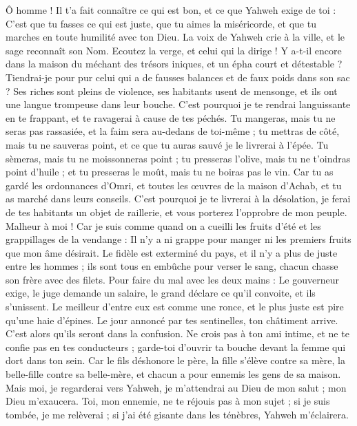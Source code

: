 \begin{multicols}{2}
Ô homme ! Il t'a fait connaître ce qui est bon, et ce que Yahweh exige de toi : C'est que tu fasses ce qui est juste, que tu aimes la miséricorde, et que tu marches en toute humilité avec ton Dieu.
La voix de Yahweh crie à la ville, et le sage reconnaît son Nom. Ecoutez la verge, et celui qui la dirige !
Y a-t-il encore dans la maison du méchant des trésors iniques, et un épha court et détestable ?
Tiendrai-je pour pur celui qui a de fausses balances et de faux poids dans son sac ?
Ses riches sont pleins de violence, ses habitants usent de mensonge, et ils ont une langue trompeuse dans leur bouche.
C'est pourquoi je te rendrai languissante en te frappant, et te ravagerai à cause de tes péchés.
Tu mangeras, mais tu ne seras pas rassasiée, et la faim sera au-dedans de toi-même ; tu mettras de côté, mais tu ne sauveras point, et ce que tu auras sauvé je le livrerai à l'épée.
Tu sèmeras, mais tu ne moissonneras point ; tu presseras l'olive, mais tu ne t'oindras point d'huile ; et tu presseras le moût, mais tu ne boiras pas le vin.
Car tu as gardé les ordonnances d'Omri, et toutes les œuvres de la maison d'Achab, et tu as marché dans leurs conseils. C'est pourquoi je te livrerai à la désolation, je ferai de tes habitants un objet de raillerie, et vous porterez l'opprobre de mon peuple.
\VerseOne{}Malheur à moi ! Car je suis comme quand on a cueilli les fruits d'été et les grappillages de la vendange : Il n'y a ni grappe pour manger ni les premiers fruits que mon âme désirait.
Le fidèle est exterminé du pays, et il n'y a plus de juste entre les hommes ; ils sont tous en embûche pour verser le sang, chacun chasse son frère avec des filets.
Pour faire du mal avec les deux mains : Le gouverneur exige, le juge demande un salaire, le grand déclare ce qu'il convoite, et ils s'unissent.
Le meilleur d'entre eux est comme une ronce, et le plus juste est pire qu'une haie d'épines. Le jour annoncé par tes sentinelles, ton châtiment arrive. C'est alors qu'ils seront dans la confusion.
Ne crois pas à ton ami intime, et ne te confie pas en tes conducteurs ; garde-toi d'ouvrir ta bouche devant la femme qui dort dans ton sein.
Car le fils déshonore le père, la fille s'élève contre sa mère, la belle-fille contre sa belle-mère, et chacun a pour ennemis les gens de sa maison.
Mais moi, je regarderai vers Yahweh, je m'attendrai au Dieu de mon salut ; mon Dieu m'exaucera.
Toi, mon ennemie, ne te réjouis pas à mon sujet ; si je suis tombée, je me relèverai ; si j'ai été gisante dans les ténèbres, Yahweh m'éclairera.

\end{multicols}
